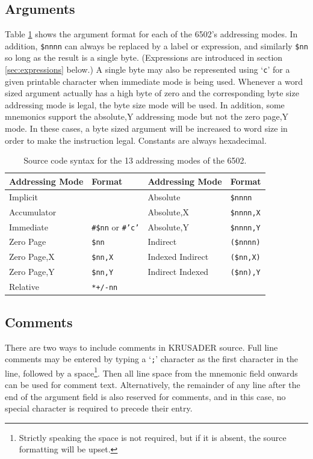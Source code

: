 \documentclass[12pt]{article}
\newcommand{\krusader}{\textsf{KRUSADER}\xspace}
\begin{document}
\subsection{Arguments}

Table \ref{tab:addmodes} shows the argument format for each of the 6502's addressing modes.
In addition, \texttt{\$nnnn} can always be replaced by a label or expression, and
similarly \texttt{\$nn} so long as the result is a single byte.  (Expressions are introduced in section \ref{sec:expressions} below.)
A single byte
may also be represented using `\texttt{c}' for a given printable character
when immediate mode is being used.
Whenever a word sized argument actually has a high byte of zero and the corresponding byte size 
addressing mode is legal, the byte size mode will be used.  
In addition, some mnemonics support the absolute,Y addressing mode but not the zero page,Y mode.  
In these cases, a byte sized argument will be increased to word size in order to make the
instruction legal.  
Constants are always hexadecimal.

\begin{table}[htb]
	\centering
	\begin{tabular}{|l|p{2.5cm}||l|p{2.5cm}|} \hline
	\textbf{Addressing Mode} & \textbf{Format} & \textbf{Addressing Mode} & \textbf{Format} \tabularnewline
	\hline
	Implicit & & Absolute & \texttt{\$nnnn} \tabularnewline\hline
	Accumulator & & Absolute,X & \texttt{\$nnnn,X} \tabularnewline\hline
	Immediate & \texttt{\#\$nn} or \texttt{\#'c'} & Absolute,Y & \texttt{\$nnnn,Y}\tabularnewline\hline
	Zero Page & \texttt{\$nn} & Indirect & \texttt{(\$nnnn)}\tabularnewline\hline
	Zero Page,X & \texttt{\$nn,X}  & Indexed Indirect & \texttt{(\$nn,X)}\tabularnewline\hline
	Zero Page,Y & \texttt{\$nn,Y} & Indirect Indexed & \texttt{(\$nn),Y}  \tabularnewline\hline
	Relative & \texttt{*+/-nn} & & \tabularnewline
	\hline
	\end{tabular}
	\caption{Source code syntax for the 13 addressing modes of the 6502.}
	\label{tab:addmodes}
\end{table}

\subsection{Comments}
There are two ways to include comments in \krusader source.  Full line comments may be 
entered by typing a `\texttt{;}' character as the first character in the line, followed
by a space\footnote{Strictly speaking the space is not required, but if it is absent,
the source formatting will be upset.}.  
Then all line space from the mnemonic field onwards can be used for comment text.
Alternatively, the remainder of any line after the end of the argument 
field is also reserved for comments, and in this case, no special character is 
required to precede their entry.
\end{document}
